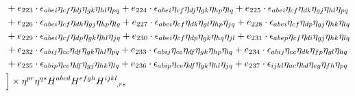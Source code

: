 \begin{itemize}
\begin{align}
    & + e_{223} \cdot \epsilon_{a b e i} \eta_{c f} \eta_{d j} \eta_{g k} \eta_{h l} \eta_{p q} + e_{224} \cdot \epsilon_{a b e i} \eta_{c f} \eta_{d j} \eta_{g k} \eta_{h p} \eta_{l q} + e_{225} \cdot \epsilon_{a b e i} \eta_{c f} \eta_{d k} \eta_{g j} \eta_{h l} \eta_{p q} \nonumber \\
    & + e_{226} \cdot \epsilon_{a b e i} \eta_{c f} \eta_{d k} \eta_{g j} \eta_{h p} \eta_{l q} + e_{227} \cdot \epsilon_{a b e i} \eta_{c f} \eta_{d k} \eta_{g l} \eta_{h p} \eta_{j q} + e_{228} \cdot \epsilon_{a b e i} \eta_{c f} \eta_{d p} \eta_{g j} \eta_{h k} \eta_{l q} \nonumber \\
    & + e_{229} \cdot \epsilon_{a b e i} \eta_{c f} \eta_{d p} \eta_{g k} \eta_{h l} \eta_{j q} + e_{230} \cdot \epsilon_{a b e i} \eta_{c f} \eta_{d p} \eta_{g k} \eta_{h q} \eta_{j l} + e_{231} \cdot \epsilon_{a b e p} \eta_{c f} \eta_{d i} \eta_{g j} \eta_{h k} \eta_{l q} \nonumber \\
    & + e_{232} \cdot \epsilon_{a b i j} \eta_{c e} \eta_{d f} \eta_{g k} \eta_{h l} \eta_{p q} + e_{233} \cdot \epsilon_{a b i j} \eta_{c e} \eta_{d f} \eta_{g k} \eta_{h p} \eta_{l q} + e_{234} \cdot \epsilon_{a b i j} \eta_{c e} \eta_{d k} \eta_{f p} \eta_{g l} \eta_{h q} \nonumber \\
    & + e_{235} \cdot \epsilon_{a b i p} \eta_{c e} \eta_{d f} \eta_{g j} \eta_{h k} \eta_{l q} + e_{236} \cdot \epsilon_{a b i p} \eta_{c e} \eta_{d f} \eta_{g k} \eta_{h l} \eta_{j q} + e_{237} \cdot \epsilon_{i j k l} \eta_{a c} \eta_{b d} \eta_{e g} \eta_{f h} \eta_{p q} \nonumber \\
    & \Big\rbrack \times \eta^{pr} \eta^{qs} H^{abcd} H^{efgh} H^{ijkl}_{\hphantom{ijkl},rs}
\end{align}
\endgroup
\end{itemize}

